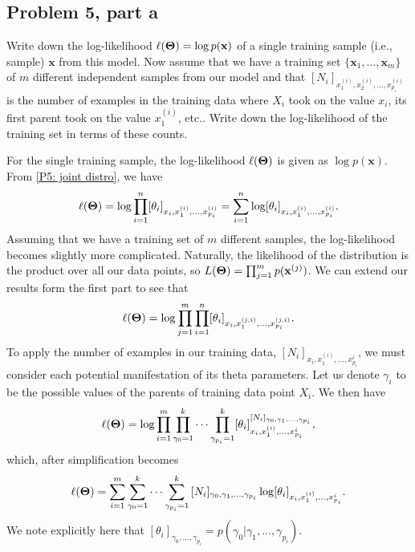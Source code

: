 \subsection{Problem 5, part a}
Write down the log-likelihood $\ell(\boldsymbol{\Theta}) = \log p(\textbf{x})$ of a single training sample (i.e., sample) $\textbf{x}$ from this model. Now assume that we have a training set $\{\textbf{x}_1, ..., \textbf{x}_m\}$ of $m$ different independent samples from our model and that $[N_i]_{x_1^{(i)}, x_2^{(i)}, ..., x_{p_i}^{(i)}}$ is the number of examples in the training data where $X_i$ took on the value $x_i$, its first parent took on the value $x_1^{(i)}$, etc.. Write down the log-likelihood of the training set in terms of these counts. 
\partbreak
\begin{solution}

    For the single training sample, the log-likelihood $\ell(\boldsymbol{\Theta})$ is given as $\log p(\textbf{x})$. From \ref{P5: joint distro}, we have
    \[\ell(\boldsymbol{\Theta}) = \log \prod_{i = 1}^n [\theta_i]_{x_i, x_1^{(i)}, ..., x_{p_i}^{(i)}} = \sum_{i = 1}^n \log [\theta_i]_{x_i, x_1^{(i)}, ..., x_{p_i}^{(i)}}.\]
    Assuming that we have a training set of $m$ different samples, the log-likelihood becomes slightly more complicated. Naturally, the likelihood of the distribution is the product over all our data points, so $L(\boldsymbol{\Theta}) = \prod_{j = 1}^m p(\textbf{x}^{(j)})$. We can extend our results form the first part to see that
    \[\ell(\boldsymbol{\Theta}) = \log \prod_{j =1}^m \prod_{i = 1}^n [\theta_i]_{x_i, x_1^{(j, i)}, ..., x_{p_i}^{(j, i)}}.\]
    To apply the number of examples in our training data, $[N_i]_{{x_i, x_1^{(i)}, ..., x_{p_i}^{i}}}$, we must consider each potential manifestation of its theta parameters. Let us denote $\gamma_i$ to be the possible values of the parents of training data point $X_i$. We then have 
    \[\ell(\boldsymbol{\Theta}) = \log \prod_{i = 1}^m\prod _{\gamma_0 = 1}^k\cdots\prod_{\gamma_{p_i} = 1}^k[\theta_i]_{x_i, x_1^{(i)}, ..., x_{p_i}^{i}}^{[N_i]_{\gamma_0, \gamma_1, ..., \gamma_{p_i}}},\]
    which, after simplification becomes
    \[\ell(\boldsymbol{\Theta}) =  \sum_{i = 1}^m\sum_{\gamma_0 = 1}^k\cdots\sum_{\gamma_{p_i} = 1}^k{[N_i]_{\gamma_0, \gamma_1, ..., \gamma_{p_i}}}\log [\theta_i]_{x_i, x_1^{(i)}, ..., x_{p_i}^{i}}.\]
    We note explicitly here that $[\theta_i]_{\gamma_0, ..., \gamma_{p_i}} = p(\gamma_0 | \gamma_1, ..., \gamma_{p_i})$.
\end{solution}

\newcommand{\scL}{\mathcal{L}}
\newcommand{\bgamma}{\boldsymbol{\gamma}}
\newpage
